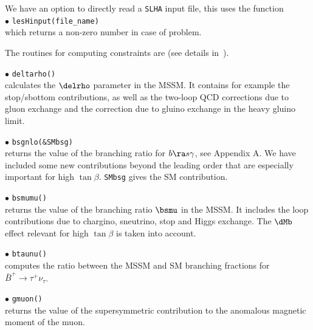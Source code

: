 \documentclass[12pt,a4paper]{article}
\begin{document}
{%

We  have an option to directly read a {\tt SLHA}  input file, this uses the  function \\
\noi$\bullet$ \verb|lesHinput(file_name) |\\
which returns a non-zero number in case of problem.

The routines for computing constraints are (see details
in~\cite{Belanger:2004yn}).

\noi$\bullet$ \verb|deltarho()|\\
 calculates  the $\delrho$ parameter in the MSSM.  It contains for example the 
stop/sbottom contributions, as well as the two-loop QCD
corrections due to gluon exchange and the correction due to gluino
exchange in the heavy gluino limit.

\noi$\bullet$ \verb|bsgnlo(&SMbsg)|\\ returns the value of the branching ratio for  $b\ra s\gamma$, see Appendix A. 
We have included some new contributions beyond the leading order that are
especially important for high $\tan\beta$. \verb|SMbsg| gives the SM contribution.

\noi$\bullet$ \verb|bsmumu()|\\ returns the value of the branching ratio $\bsmu$ in the
MSSM.
It includes the loop contributions
due to chargino, sneutrino, stop and Higgs exchange. The $\dMb$ 
effect relevant for high $\tan \beta$ is taken into account.

\noi$\bullet$ \verb|btaunu()|\\
computes the ratio between the MSSM and SM branching fractions for $\bar{B}^+\rightarrow\tau^+\nu_\tau$. 


\noi$\bullet$ \verb|gmuon()|\\
returns the value of the supersymmetric contribution to the
anomalous magnetic moment of the muon.

}
\end{document}
